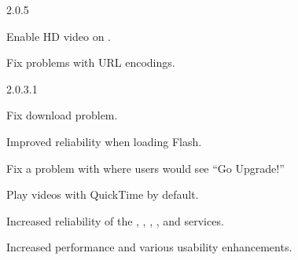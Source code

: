 \begin{changelog}{2.0.5}
\item Enable HD video on .
\item Fix problems with URL encodings.
\end{changelog}

\begin{changelog}{2.0.3.1}
\item Fix  download problem.
\item Improved reliability when loading Flash. 
\item Fix a problem with  where users would see ``Go Upgrade!'' 
\item Play videos with QuickTime by default.
\item Increased reliability of the , , , , and  services.
\item Increased performance and various usability enhancements.
\end{changelog}
